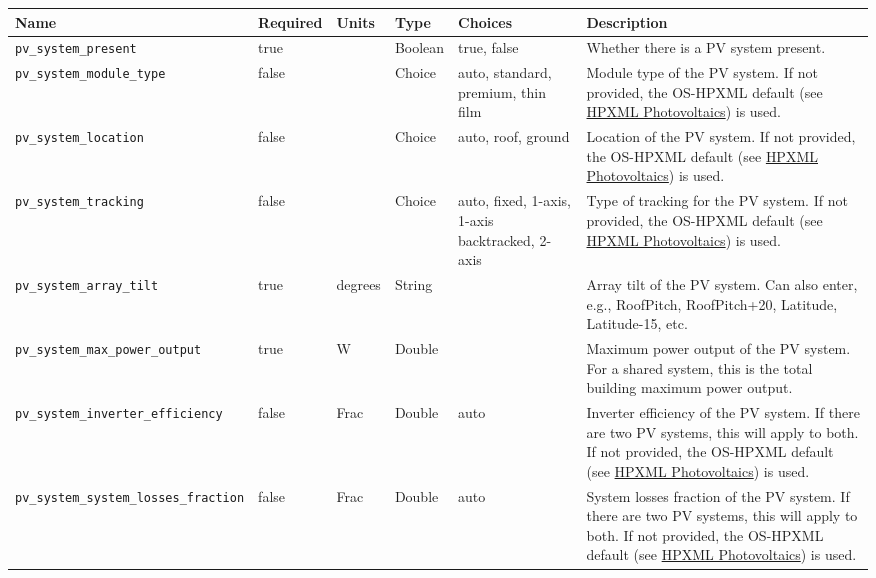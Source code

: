 \begin{longtable}[]{@{}llllll@{}}
\toprule\noalign{}
Name & Required & Units & Type & Choices & Description \\
\midrule\noalign{}
\endhead
\bottomrule\noalign{}
\endlastfoot
\texttt{pv\_system\_present} & true & & Boolean & true, false & Whether
there is a PV system present. \\
\texttt{pv\_system\_module\_type} & false & & Choice & auto, standard,
premium, thin film & Module type of the PV system. If not provided, the
OS-HPXML default (see
\href{https://openstudio-hpxml.readthedocs.io/en/v1.7.0/workflow_inputs.html\#hpxml-photovoltaics}{HPXML
Photovoltaics}) is used. \\
\texttt{pv\_system\_location} & false & & Choice & auto, roof, ground &
Location of the PV system. If not provided, the OS-HPXML default (see
\href{https://openstudio-hpxml.readthedocs.io/en/v1.7.0/workflow_inputs.html\#hpxml-photovoltaics}{HPXML
Photovoltaics}) is used. \\
\texttt{pv\_system\_tracking} & false & & Choice & auto, fixed, 1-axis,
1-axis backtracked, 2-axis & Type of tracking for the PV system. If not
provided, the OS-HPXML default (see
\href{https://openstudio-hpxml.readthedocs.io/en/v1.7.0/workflow_inputs.html\#hpxml-photovoltaics}{HPXML
Photovoltaics}) is used. \\
\texttt{pv\_system\_array\_tilt} & true & degrees & String & & Array
tilt of the PV system. Can also enter, e.g., RoofPitch, RoofPitch+20,
Latitude, Latitude-15, etc. \\
\texttt{pv\_system\_max\_power\_output} & true & W & Double & & Maximum
power output of the PV system. For a shared system, this is the total
building maximum power output. \\
\texttt{pv\_system\_inverter\_efficiency} & false & Frac & Double & auto
& Inverter efficiency of the PV system. If there are two PV systems,
this will apply to both. If not provided, the OS-HPXML default (see
\href{https://openstudio-hpxml.readthedocs.io/en/v1.7.0/workflow_inputs.html\#hpxml-photovoltaics}{HPXML
Photovoltaics}) is used. \\
\texttt{pv\_system\_system\_losses\_fraction} & false & Frac & Double &
auto & System losses fraction of the PV system. If there are two PV
systems, this will apply to both. If not provided, the OS-HPXML default
(see
\href{https://openstudio-hpxml.readthedocs.io/en/v1.7.0/workflow_inputs.html\#hpxml-photovoltaics}{HPXML
Photovoltaics}) is used. \\

\end{longtable}
